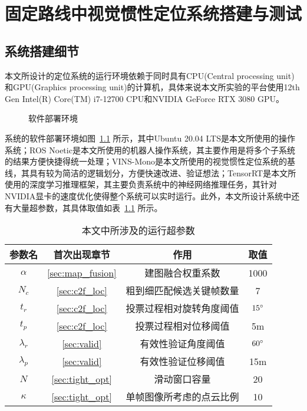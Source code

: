 




\chapter{固定路线中视觉惯性定位系统搭建与测试}

\section{系统搭建细节}

本文所设计的定位系统的运行环境依赖于同时具有CPU(Central processing unit)和GPU(Graphics processing unit)的计算机，具体来说本文所实验的平台使用12th Gen Intel(R) Core(TM) i7-12700 CPU和NVIDIA GeForce RTX 3080 GPU。

\begin{figure}
  \centering
  \caption{软件部署环境}
  \label{fig:software}
\end{figure}

系统的软件部署环境如图~\ref{fig:software} 所示，其中Ubuntu 20.04 LTS是本文所使用的操作系统；ROS Noetic是本文所使用的机器人操作系统，其主要作用是将多个子系统的结果方便快捷得统一处理；VINS-Mono是本文所使用的视觉惯性定位系统的基线，其具有较为简洁的逻辑划分，方便快速改进、验证想法；TensorRT是本文所使用的深度学习推理框架，其主要负责系统中的神经网络推理任务，其针对NVIDIA显卡的速度优化使得整个系统可以实时运行。此外，本文所设计系统中还有大量超参数，其具体取值如表~\ref{tab:hyperparameters} 所示。

\begin{table}
\centering
\caption{本文中所涉及的运行超参数}
\begin{tabular}{cccc}
\toprule
参数名 & 首次出现章节 & 作用 & 取值 \\
\midrule
$\alpha$ &  \ref{sec:map_fusion}  & 建图融合权重系数     & 1000 \\
$N_c$ & \ref{sec:c2f_loc}  & 粗到细匹配候选关键帧数量 & 7   \\
$t_r$ &  \ref{sec:c2f_loc}  & 投票过程相对旋转角度阈值 & $15\degree$   \\
$t_p$ &  \ref{sec:c2f_loc}  & 投票过程相对位移阈值   & 5m    \\
$\lambda_r$ &  \ref{sec:valid}  & 有效性验证角度阈值    & $60\degree$   \\
$\lambda_p$ &  \ref{sec:valid}  & 有效性验证位移阈值    & 15m   \\
$N$ &  \ref{sec:tight_opt}  & 滑动窗口容量       & 20   \\
$\kappa$ &  \ref{sec:tight_opt}  & 单帧图像所考虑的点云比例 & 10  \\
\bottomrule
\end{tabular}
\label{tab:hyperparameters}
\end{table}

